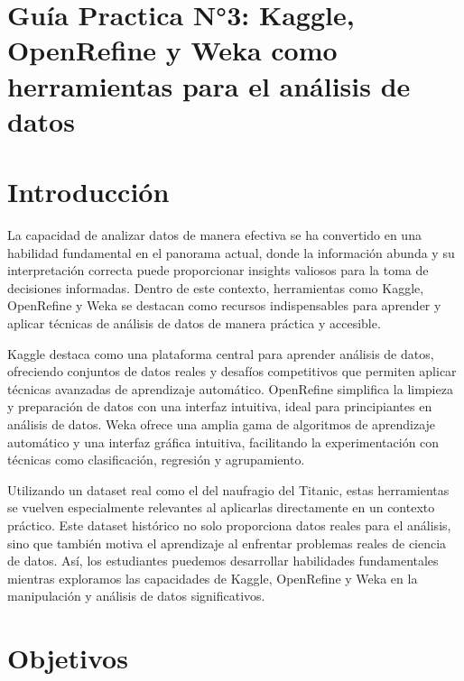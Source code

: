 \documentclass[12pt]{article}
\begin{document}
    

    \tableofcontents
    \newpage

    \section*{\centering Guía Practica N°3: Kaggle, OpenRefine y Weka como herramientas para el análisis de datos}

    \section{Introducción}
        La capacidad de analizar datos de manera efectiva se ha convertido en una habilidad fundamental en el panorama actual, donde la información abunda y su interpretación correcta puede proporcionar insights valiosos para la toma de decisiones informadas. Dentro de este contexto, herramientas como Kaggle, OpenRefine y Weka se destacan como recursos indispensables para aprender y aplicar técnicas de análisis de datos de manera práctica y accesible.
        
        Kaggle destaca como una plataforma central para aprender análisis de datos, ofreciendo conjuntos de datos reales y desafíos competitivos que permiten aplicar técnicas avanzadas de aprendizaje automático. OpenRefine simplifica la limpieza y preparación de datos con una interfaz intuitiva, ideal para principiantes en análisis de datos. Weka ofrece una amplia gama de algoritmos de aprendizaje automático y una interfaz gráfica intuitiva, facilitando la experimentación con técnicas como clasificación, regresión y agrupamiento.
        
        Utilizando un dataset real como el del naufragio del Titanic, estas herramientas se vuelven especialmente relevantes al aplicarlas directamente en un contexto práctico. Este dataset histórico no solo proporciona datos reales para el análisis, sino que también motiva el aprendizaje al enfrentar problemas reales de ciencia de datos. Así, los estudiantes puedemos desarrollar habilidades fundamentales mientras exploramos las capacidades de Kaggle, OpenRefine y Weka en la manipulación y análisis de datos significativos.

    \section{Objetivos}
\end{document}
